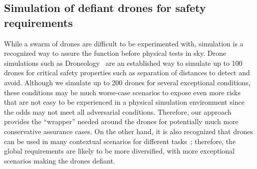 \subsection{Simulation of defiant drones for safety requirements}
While a swarm of drones are difficult to be experimented with, simulation is a recognized way to assure the function before physical tests in sky. Drone simulations such as Droneology~\cite{Cleland-Huang18NIER} are an established way to simulate up to 100 drones for critical safety properties such as separation of distances to detect and avoid. Although we simulate up to 200 drones for several exceptional conditions, these conditions may be much worse-case scenarios to expose even more risks that are not easy to be experienced in a physical simulation environment since the odds may not meet all adversarial conditions. Therefore, our approach provides the ``wrapper'' needed around the drones for potentially much more conservative assurance cases. On the other hand, it is also recognized that drones can be used in many contextual scenarios for different tasks~\cite{droneapplications}; therefore, the global requirements are likely to be more diversified, with more exceptional scenarios making the drones defiant.








